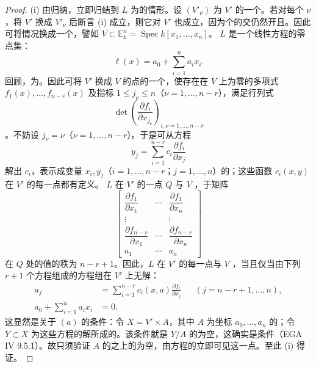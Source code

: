 \begin{proof}
(i) 由归纳，立即归结到 $L$ 为的情形。设 $(V'_\nu)$ 为 $V'$ 的一个。若对每个 $\nu$，将 $V'$ 换成 $V'_\nu$ 后断言 (i) 成立，则它对 $V'$ 也成立，因为个的交仍然开且。因此可将情况换成一个，譬如 $V\subset\mathbb E^n_k=\operatorname{Spec}k[x_1,\ldots,x_n]$。 $L$ 是一个线性方程的零点集：
\[
 \ell(x)=a_0+\sum_{i=1}^na_ix_i.
\]
回顾，为。因此可将 $V'$ 换成 $V$ 的点的一个，使存在在 $V$ 上为零的多项式 $f_1(x),\ldots,f_{n-r}(x)$ 及指标 $1\leq j_\nu\leq n$（$\nu=1,\ldots,n-r$），满足行列式
\[
 \det\left(\frac{\partial f_i}{\partial x_{j_\nu}}\right)_{i,\nu=1,\ldots,n-r}
\]
。不妨设 $j_\nu=\nu$（$\nu=1,\ldots,n-r$）。于是可从方程
\[
 y_j=\sum_{i=1}^{n-r}c_i\frac{\partial f_i}{\partial x_j}
\]
解出 $c_i$，表示成变量 $x_i,y_j$（$i=1,\ldots,n-r$；$j=1,\ldots,n$）的；这些函数 $c_i(x,y)$ 在 $V'$ 的每一点都有定义。
$L$ 在 $V'$ 的一点 $Q$ 与 $V$ ，于矩阵
\[
 \begin{bmatrix}
 \dfrac{\partial f_1}{\partial x_1}&\cdots&\dfrac{\partial f_1}{\partial x_n}\\
 \vdots&&\vdots\\
 \dfrac{\partial f_{n-r}}{\partial x_1}&\cdots&\dfrac{\partial f_{n-r}}{\partial x_n}\\
 a_1&\cdots&a_n
 \end{bmatrix}
\]
在 $Q$ 处的值的秩为 $n-r+1$。因此，$L$ 在 $V'$ 的每一点与 $V$ ，当且仅当由下列 $r+1$ 个方程组成的方程组在 $V'$ 上无解：
\[
 \begin{aligned}
 a_j&=\sum_{i=1}^{n-r}c_i(x,a)\frac{\partial f_i}{\partial x_j}
 &&(j=n-r+1,\ldots,n),\\
 a_0+\sum_{i=1}^na_ix_i&=0.
 \end{aligned}
\]
这显然是关于 $(a)$ 的条件：令 $X=V'\times A$，其中 $A$ 为坐标 $a_0,\ldots,a_n$ 的；令 $Y\subset X$ 为这些方程的解所成的。该条件就是 $Y/A$ 的为空，这确实是条件（EGA IV 9.5.1）。故只须验证 $A$ 的之上的为空，由方程的立即可见这一点。至此 (i) 得证。


\end{proof}
